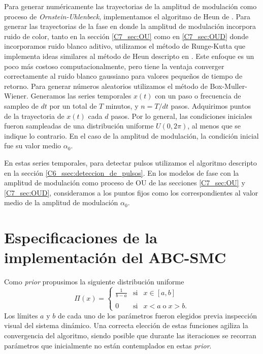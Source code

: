 \documentclass[./main.tex]{subfiles}
\begin{document}
\begin{subappendices}
Para generar numéricamente las trayectorias de la amplitud de modulación como proceso de \textit{Ornstein-Uhlenbeck}, implementamos el algoritmo de Heun de \cite{SanMiguel2000}. Para generar las trayectorias de la fase en donde la amplitud de modulación incorpora ruido de color, tanto en la sección \ref{C7_sec:OU} como en \ref{C7_sec:OUD} donde incorporamos ruido blanco aditivo, utilizamos el método de Runge-Kutta que implementa ideas similares al método de Heun descripto en \cite{SanMiguel2000}. Este enfoque es un poco más costoso computacionalmente, pero tiene la ventaja converger correctamente al ruido blanco gaussiano para valores pequeños de tiempo de retorno. Para generar números aleatorios utilizamos el método de Box-Muller-Wiener. Generamos las series temporales $x(t)$ con un paso o frecuencia de sampleo de $dt$ por un total de $T$ minutos, y $n = T/dt $ pasos. Adquirimos puntos de la trayectoria de $x(t)$ cada $d$ pasos. Por lo general, las condiciones iniciales fueron sampleadas de una distribución uniforme $U(0,2\pi)$, al menos que se indique lo contrario. En el caso de la amplitud de modulación, la condición inicial fue su valor medio $\alpha_0$.


En estas series temporales, para detectar pulsos utilizamos el algoritmo descripto en la sección \ref{C6_ssec:deteccion_de_pulsos}. En los modelos de fase con la amplitud de modulación como proceso de OU de las secciones \ref{C7_sec:OU} y \ref{C7_sec:OUD}, consideramos a los puntos fijos como los correspondientes al valor medio de la amplitud de modulación $\alpha_0$.



\chapter{Especificaciones de la implementación del ABC-SMC}
\label{C6_ap:ABC-SMC}
\label{C7_ap:ABC-SMC}

Como \textit{prior} propusimos la siguiente distribución uniforme
\begin{equation*}
    \Pi(x) = \left\{ \begin{array}{lcc}
             \frac{1}{b-a} &   \text{si}  & x \in [a,b] \\
             \\ 0 &  \text{si} & x < a \; \text{o} \; x > b.
             \end{array}
   \right.
\end{equation*}
Los límites $a$ y $b$ de cada uno de los parámetros fueron elegidos previa inspección visual del sistema dinámico. Una correcta elección de estas funciones agiliza la convergencia del algoritmo, siendo posible que durante las iteraciones se recorran parámetros que inicialmente no están contemplados en estas \textit{prior}. 


\end{subappendices}
\end{document}
